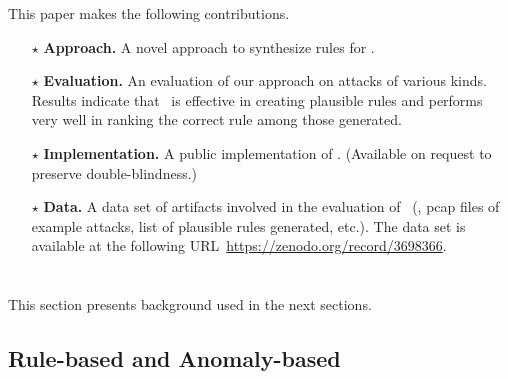 \documentclass[sigconf,review, anonymous]{acmart}
\begin{document}

This paper makes the following contributions.

\newcommand{\Contrib}[1]{$\star$#1}
\begin{itemize}[topsep=.2ex,itemsep=.2ex,leftmargin=0.8em]

\item[\Contrib{}]\textbf{Approach.} A novel approach to synthesize
  rules for \nids.

\item[\Contrib{}]\textbf{Evaluation.} An evaluation of our approach on
  attacks of various kinds. Results indicate that \tname\ is effective
  in creating plausible rules and performs very well in ranking the
  correct rule among those generated.

\item[\Contrib{}]\textbf{Implementation.} A public implementation of
  \tname. (Available on request to preserve double-blindness.)

\item[\Contrib{}]\textbf{Data.} A data set of artifacts involved in
  the evaluation of \tname\ (\eg{}, pcap files of example attacks, list
  of plausible rules generated, etc.). The data set is available at
  the following URL~\url{https://zenodo.org/record/3698366}.
  
\end{itemize}


\section{\nids}
\label{sec:background}

This section presents background used in the next sections.

\subsection{Rule-based and Anomaly-based \nids}
\end{document}
